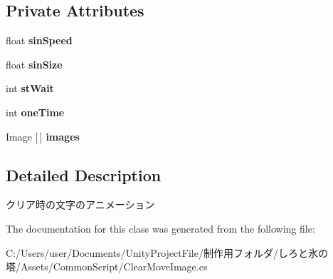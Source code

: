 \subsection*{Private Attributes}
\begin{DoxyCompactItemize}
\item 
\mbox{\label{class_clear_move_image_a6c0d40c9894876c7ebf487e85bc145b8}} 
float {\bfseries sin\+Speed}
\item 
\mbox{\label{class_clear_move_image_ac1ae046e0f8ce885ac5ba07dd59ead9e}} 
float {\bfseries sin\+Size}
\item 
\mbox{\label{class_clear_move_image_a1c3930286612d4fd7b69c268fb813fe9}} 
int {\bfseries st\+Wait}
\item 
\mbox{\label{class_clear_move_image_a8ba0158f52d021e9373a27ee9a9d9601}} 
int {\bfseries one\+Time}
\item 
\mbox{\label{class_clear_move_image_a4728b8dea437d3b850a94504b8835ad7}} 
Image \mbox{[}$\,$\mbox{]} {\bfseries images}
\end{DoxyCompactItemize}


\subsection{Detailed Description}
クリア時の文字のアニメーション 



The documentation for this class was generated from the following file\+:\begin{DoxyCompactItemize}
\item 
C\+:/\+Users/user/\+Documents/\+Unity\+Project\+File/制作用フォルダ/しろと氷の塔/\+Assets/\+Common\+Script/Clear\+Move\+Image.\+cs\end{DoxyCompactItemize}
